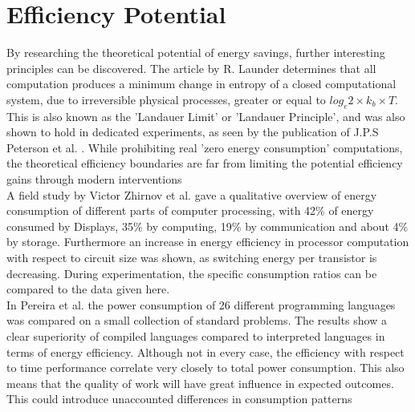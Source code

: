 \section{Efficiency Potential}\label{sec:potential} 
By researching the theoretical potential of energy savings, further interesting principles can be discovered. The article by R. Launder \cite{entropy} determines that all computation produces a minimum change in entropy of a closed computational system, due to irreversible physical processes, greater or equal to $log_e 2 \times k_b \times T$. This is also known as the 'Landauer Limit' or 'Landauer Principle', and was also shown to hold in dedicated experiments, as seen by the publication of J.P.S Peterson et al. \cite{entropy-demo}. While prohibiting real 'zero energy consumption' computations, the theoretical efficiency boundaries are far from limiting the potential efficiency gains through modern interventions\\
A field study by Victor Zhirnov et al. \cite{min-energy} gave a qualitative overview of energy consumption of different parts of computer processing, with 42\% of energy consumed by Displays, 35\% by computing, 19\% by communication and about 4\% by storage. Furthermore an increase in energy efficiency in processor computation with respect to circuit size was shown, as switching energy per transistor is decreasing. During experimentation, the specific consumption ratios can be compared to the data given here.\\
In Pereira et al. \cite{Pereira} the power consumption of 26 different programming languages was compared on a small collection of standard problems. The results show a clear superiority of compiled languages compared to interpreted languages in terms of energy efficiency. Although not in every case, the efficiency with respect to time performance correlate very closely to total power consumption. This also means that the quality of work will have great influence in expected outcomes. This could introduce unaccounted differences in consumption patterns\\